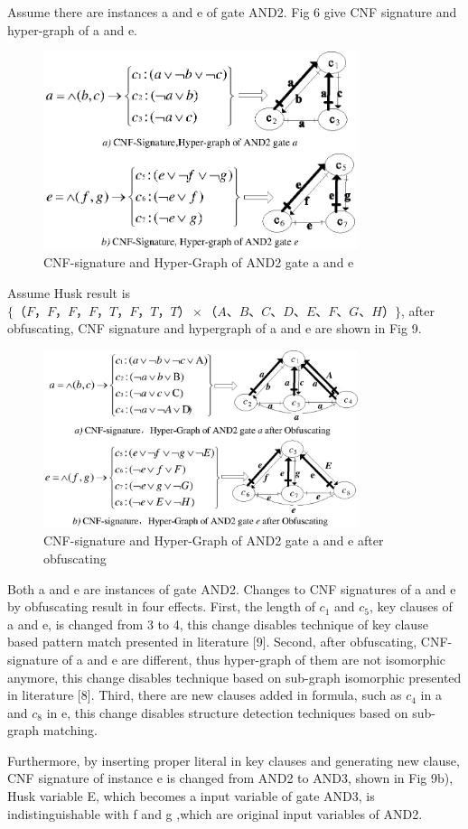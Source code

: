 \documentclass[runningheads,a4paper]{llncs}
\begin{document}
\setlength{\parindent}{2em} 
Assume there are instances a and e of gate AND2. Fig 6 give CNF signature and hyper-graph of a and e.
\begin{figure}
\centering
\includegraphics[width=9.2cm]{a6}
\caption{CNF-signature and Hyper-Graph of AND2 gate a and e}
\end{figure}
Assume Husk result is $\{（F，F，F，F，T，F，T，T）\times（A、B、C、D、E、F、G、H）\}$, after obfuscating, CNF signature and hypergraph of a and e are shown in Fig 9.
\begin{figure}
\centering
\includegraphics[width=9.2cm]{a7}
\caption{CNF-signature and Hyper-Graph of AND2 gate a and e after obfuscating}
\end{figure}
Both a and e are instances of gate AND2. Changes to CNF signatures of a and e by obfuscating result in four effects.
First, the length of $c_1$ and $c_5$, key clauses of a and e, is changed from 3 to 4, this change disables technique of key clause based pattern match presented in literature [9].
Second, after obfuscating, CNF-signature of a and e are different, thus hyper-graph of them are not isomorphic anymore, this change disables technique based on sub-graph isomorphic presented in literature [8].
Third, there are new clauses added in formula, such as $c_4$ in a and $c_8$ in e, this change disables structure detection techniques based on sub-graph matching. 

Furthermore, by inserting proper literal in key clauses and generating new clause, CNF signature of instance e is changed from AND2 to AND3, shown in Fig 9b),
Husk variable E, which becomes a input variable of gate AND3, is indistinguishable with f and g ,which are original input variables of AND2.
\end{document}
